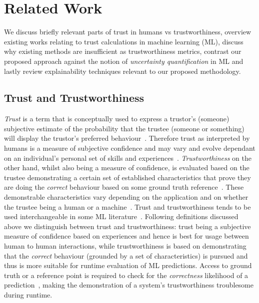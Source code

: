 \section{Related Work}\label{sec:related_work}
%
%
We discuss briefly relevant parts of trust in humans vs trustworthiness, overview existing works relating to trust calculations in machine learning (ML), discuss why existing methods are insufficient as trustworthiness metrics, contrast our proposed approach against the notion of \textit{uncertainty quantification} in ML and lastly review explainability techniques relevant to our proposed methodology. 
%



\subsection{Trust and Trustworthiness}\label{trustVStrustowrthiness}
\textit{Trust} is a term that is conceptually used to express a trustor's (someone) subjective estimate of the probability that the trustee (someone or something) will display the trustor's preferred behaviour~\cite{Bauer2013}.
%
Therefore trust as interpreted by humans is a measure of subjective confidence and may vary and evolve dependant on an individual's personal set of skills and experiences~\cite{Hommel2015, Mitkidis2017,Najib2019}. 
%
\textit{Trustworthiness} on the other hand, whilst also being a measure of confidence, is evaluated based on the trustee demonstrating a certain set of established characteristics that prove they are doing the \textit{correct} behaviour based on some ground truth reference~\cite{Bauer2013, Bournival2022}.
%
These demonstrable characteristics vary depending on the application and on whether the trustee being a human or a machine~\cite{Wing2021}.
%
Trust and trustworthiness tends to be used interchangeable in some ML literature~\cite{DeBie2021,Jiang2018}.
%
Following definitions discussed above we distinguish between trust and trustworthiness: trust being a subjective measure of confidence based on experiences and hence is best for usage between human to human interactions, while trustworthiness is based on demonstrating that the \textit{correct} behaviour (grounded by a set of characteristics) is pursued and thus is more suitable for runtime evaluation of ML predictions. 
%
Access to ground truth or a reference point is required to check for the \textit{correctness} likelihood of a prediction~\cite{Barr2015}, making the demonstration of a system's trustworthiness troublesome during runtime.


